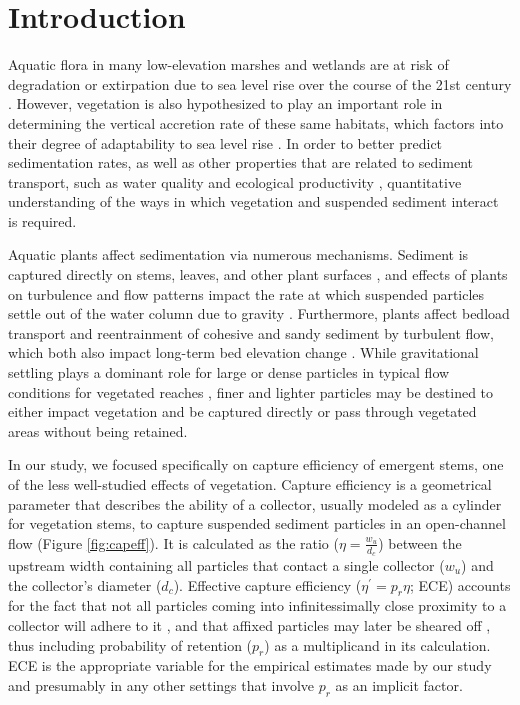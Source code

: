 \documentclass[geosciences,article,submit,moreauthors,pdftex]{Definitions/mdpi}
\begin{document}
\section{Introduction}

Aquatic flora in many low-elevation marshes and wetlands are at risk of degradation or extirpation due to sea level rise over the course of the 21st century \cite{thorne2018us,jankowski2017vulnerability}. However, vegetation is also hypothesized to play an important role in determining the vertical accretion rate of these same habitats, which factors into their degree of adaptability to sea level rise \cite{kirwan2010limits}. In order to better predict sedimentation rates, as well as other properties that are related to sediment transport, such as water quality \cite{goodwin2003temporal} and ecological productivity \cite{kirwan2007coupled}, quantitative understanding of the ways in which vegetation and suspended sediment interact is required.

Aquatic plants affect sedimentation via numerous mechanisms. Sediment is captured directly on stems, leaves, and other plant surfaces \cite{mudd2010does, peruzzo2012capillary}, and effects of plants on turbulence and flow patterns impact the rate at which suspended particles settle out of the water column due to gravity \cite{christiansen2000flow, leonard1995flow, Nielsen_1993, Jacobs_2016, Wang_2018}. Furthermore, plants affect bedload transport \cite{yager2013influence, yang2019impact, jordanova2003experimental} and reentrainment of cohesive \cite{d2007landscape} and sandy \cite{tinoco2018turbulence} sediment by turbulent flow, which both also impact long-term bed elevation change \cite{wu2005depth,d2007landscape}. While gravitational settling plays a dominant role for large or dense particles in typical flow conditions for vegetated reaches \cite{mudd2010does, leonard1995flow}, finer and lighter particles may be destined to either impact vegetation and be captured directly or pass through vegetated areas without being retained.

In our study, we focused specifically on capture efficiency of emergent stems, one of the less well-studied effects of vegetation. Capture efficiency is a geometrical parameter that describes the ability of a collector, usually modeled as a cylinder for vegetation stems, to capture suspended sediment particles in an open-channel flow (Figure \ref{fig:capeff}). It is calculated as the ratio ($\eta=\frac{w_u}{d_c}$) between the upstream width containing all particles that contact a single collector ($w_u$) and the collector's diameter ($d_c$). Effective capture efficiency ($\eta^\prime=p_r\eta$; ECE) accounts for the fact that not all particles coming into infinitessimally close proximity to a collector will adhere to it \cite{spielman1977particle}, and that affixed particles may later be sheared off \cite{defina2010floating}, thus including probability of retention ($p_r$) as a multiplicand in its calculation. ECE is the appropriate variable for the empirical estimates made by our study and presumably in any other settings that involve $p_r$ as an implicit factor.
\end{document}
